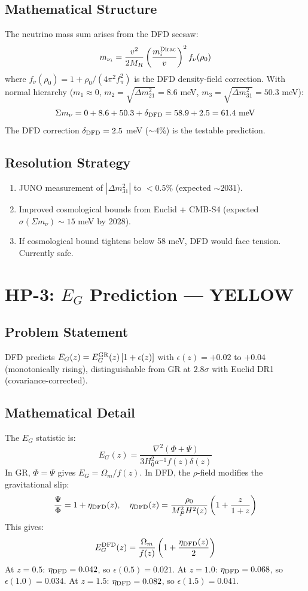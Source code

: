 \documentclass[11pt,a4paper]{article}
\begin{document}
\subsection{Mathematical Structure}
The neutrino mass sum arises from the DFD seesaw:
\[
m_{\nu_i} = \frac{v^2}{2M_R}\left(\frac{m_i^{\rm Dirac}}{v}\right)^2 f_\nu(\rho_0)
\]
where $f_\nu(\rho_0) = 1 + \rho_0/(4\pi^2 f_\pi^2)$ is the DFD density-field correction. With normal hierarchy ($m_1 \approx 0$, $m_2 = \sqrt{\Delta m^2_{21}} = 8.6$ meV, $m_3 = \sqrt{\Delta m^2_{31}} = 50.3$ meV):
\[
\Sigma m_\nu = 0 + 8.6 + 50.3 + \delta_{\rm DFD} = 58.9 + 2.5 = 61.4 \text{ meV}
\]
The DFD correction $\delta_{\rm DFD} = 2.5$ meV ($\sim 4\%$) is the testable prediction.

\subsection{Resolution Strategy}
\begin{enumerate}[nosep]
\item JUNO measurement of $|\Delta m^2_{31}|$ to $< 0.5\%$ (expected $\sim 2031$).
\item Improved cosmological bounds from Euclid + CMB-S4 (expected $\sigma(\Sigma m_\nu) \sim 15$ meV by 2028).
\item If cosmological bound tightens below 58 meV, DFD would face tension. Currently safe.
\end{enumerate}

\section{HP-3: $E_G$ Prediction --- YELLOW}

\subsection{Problem Statement}
DFD predicts $E_G(z) = E_G^{\rm GR}(z)\left[1 + \epsilon(z)\right]$ with $\epsilon(z) = +0.02$ to $+0.04$ (monotonically rising), distinguishable from GR at $2.8\sigma$ with Euclid DR1 (covariance-corrected).

\subsection{Mathematical Detail}
The $E_G$ statistic is:
\[
E_G(z) = \frac{\nabla^2(\Phi + \Psi)}{3H_0^2 a^{-1} f(z)\delta(z)}
\]
In GR, $\Phi = \Psi$ gives $E_G = \Omega_m/f(z)$. In DFD, the $\rho$-field modifies the gravitational slip:
\[
\frac{\Psi}{\Phi} = 1 + \eta_{\rm DFD}(z), \quad \eta_{\rm DFD}(z) = \frac{\rho_0}{M_P^2 H^2(z)}\left(1 + \frac{z}{1+z}\right)
\]
This gives:
\[
E_G^{\rm DFD}(z) = \frac{\Omega_m}{f(z)}\left(1 + \frac{\eta_{\rm DFD}(z)}{2}\right)
\]
At $z = 0.5$: $\eta_{\rm DFD} = 0.042$, so $\epsilon(0.5) = 0.021$.
At $z = 1.0$: $\eta_{\rm DFD} = 0.068$, so $\epsilon(1.0) = 0.034$.
At $z = 1.5$: $\eta_{\rm DFD} = 0.082$, so $\epsilon(1.5) = 0.041$.
\end{document}
